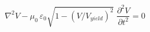 %
\begin{equation}
    \nabla^2 V - \mu_0 \, \varepsilon_0 \sqrt{1 - (V/V_{yield})^2}
    \;\frac{\partial^2 V}{\partial t^2} = 0
    \label{eq:master_dielectric_wave}
\end{equation}

